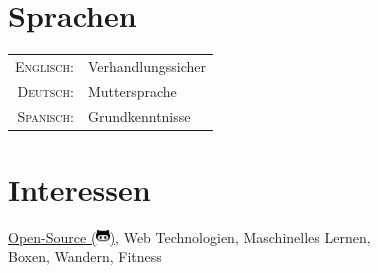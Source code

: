 \documentclass[a4paper,10pt]{article} %
\begin{document}
\section{Sprachen}
 
\begin{tabular}{rl}
\textsc{Englisch:} & Verhandlungssicher\\
 
\textsc{Deutsch:} & Muttersprache\\
 
\textsc{Spanisch:} & Grundkenntnisse\\
\end{tabular}
 
 
 
\section{Interessen}
 
\href{https://github.com/JavaTheHood}{Open-Source (\includegraphics[height=10pt]{octoface})}, Web Technologien, Maschinelles Lernen, \\
Boxen, Wandern, Fitness
 
 
\newpage
 
\end{document}
